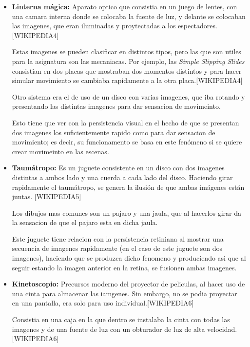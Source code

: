 \documentclass{article}
\begin{document}
\begin{itemize}
    \item \textbf{Linterna mágica: }Aparato optico que consistia en un juego de lentes, con una camara interna donde se colocaba la fuente de luz, y delante se colocaban las imagenes, que eran iluminadas y proytectadas a los espectadores. [WIKIPEDIA4] 
    
    Estas imagenes se pueden clasificar en distintos tipos, pero las que son utiles para la asignatura son las mecaniacas. Por ejemplo, las \textit{Simple Slipping Slides} consistian en dos placas que mostraban dos momentos distintos y para hacer simular movimiento se cambiaba rapidamente a la otra placa.[WIKIPEDIA4]

    Otro sistema era el de uso de un disco con varias imagenes, que iba rotando y presentando las distintas imagenes para dar sensacion de movimeinto.

    Esto tiene que ver con la persistencia visual en el hecho de que se presentan dos imagenes los suficientemente rapido como para dar sensacion de movimiento; es decir, su funcionamento se basa en este fenómeno si se quiere crear movimeinto en las escenas.

    \item \textbf{Taumátropo: }Es un juguete consistente en un disco con dos imagenes distintas a ambos lado y una cuerda a cada lado del disco. Haciendo girar rapidamente el taumátropo, se genera la ilusión de que ambas imágenes están juntas. [WIKIPEDIA5]
    
    Los dibujos mas comunes son un pajaro y una jaula, que al hacerlos girar da la sensacion de que el pajaro esta en dicha jaula.

    Este juguete tiene relacion con la persistencia retiniana al mostrar una secuencia de imagenes rapidamente (en el caso de este juguete son dos imagenes), haciendo que se produzca dicho fenomeno y produciendo asi que al seguir estando la imagen anterior en la retina, se fusionen ambas imagenes.

    \item \textbf{Kinetoscopio: }Precursos moderno del proyector de peliculas, al hacer uso de una cinta para almacenar las iamgenes. Sin embargo, no se podia proyectar en una pantalla, era solo para uso individual.[WIKIPEDIA6]
    
    Consistia en una caja en la que dentro se instalaba la cinta con todas las imagenes y de una fuente de luz con un obturador de luz de alta velocidad.[WIKIPEDIA6]


\end{itemize}
\end{document}
